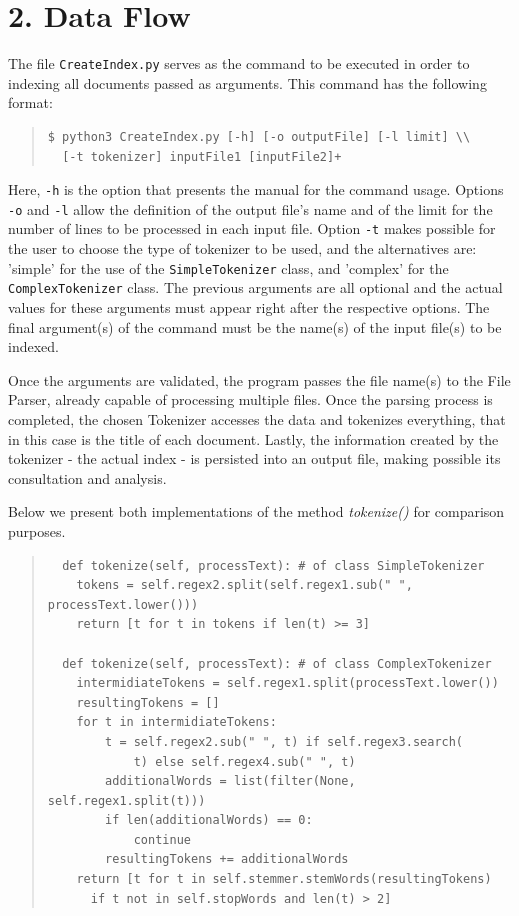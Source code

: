 \documentclass[12pt]{article}
\begin{document}
\newpage
\section*{2. Data Flow}

The file \texttt{CreateIndex.py} serves as the command to be executed in order to 
indexing all documents passed as arguments.
This command has the following format:

\begin{quote}
\begin{verbatim}
$ python3 CreateIndex.py [-h] [-o outputFile] [-l limit] \\
  [-t tokenizer] inputFile1 [inputFile2]+
\end{verbatim}
\end{quote}

Here, \texttt{-h} is the option that presents the manual for the command usage.
Options \texttt{-o} and \texttt{-l} allow the definition of the output file's 
name and of the limit for the number of lines to be processed in each input file.
Option \texttt{-t} makes possible for the user to choose the type of tokenizer
to be used, and the alternatives are: 'simple' for the use of the 
\texttt{SimpleTokenizer} class, and 'complex' for the \texttt{ComplexTokenizer} class.
The previous arguments are all optional and the actual values for these arguments
must appear right after the respective options.
The final argument(s) of the command must be the name(s) of the input file(s) to
be indexed.

Once the arguments are validated, the program passes the file name(s) to the 
File Parser, already capable of processing multiple files. 
Once the parsing process is completed, the chosen Tokenizer accesses the 
data and tokenizes everything, that in this case is the title of each 
document.
Lastly, the information created by the tokenizer - the actual index - is 
persisted into an output file, making possible its consultation and analysis.

Below we present both implementations of the method {\it tokenize()\/} for
comparison purposes.

\begingroup
\addtolength\leftmargini{-0.4in}
\addtolength\baselineskip{-0.05in}
\begin{quote}
\begin{verbatim}
  def tokenize(self, processText): # of class SimpleTokenizer
    tokens = self.regex2.split(self.regex1.sub(" ", processText.lower()))
    return [t for t in tokens if len(t) >= 3]

  def tokenize(self, processText): # of class ComplexTokenizer
    intermidiateTokens = self.regex1.split(processText.lower())
    resultingTokens = []
    for t in intermidiateTokens:
        t = self.regex2.sub(" ", t) if self.regex3.search(
            t) else self.regex4.sub(" ", t)
        additionalWords = list(filter(None, self.regex1.split(t)))
        if len(additionalWords) == 0:
            continue
        resultingTokens += additionalWords
    return [t for t in self.stemmer.stemWords(resultingTokens) 
      if t not in self.stopWords and len(t) > 2]
\end{verbatim}
\end{quote}
\endgroup
\end{document}
